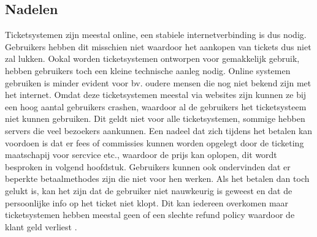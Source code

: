 \subsection{Nadelen}
Ticketsystemen zijn meestal online, een stabiele internetverbinding is dus nodig. Gebruikers hebben dit misschien niet waardoor het aankopen van tickets dus niet zal lukken. 
Ookal worden ticketsystemen ontworpen voor gemakkelijk gebruik, hebben gebruikers toch een kleine technische aanleg nodig. Online systemen gebruiken is minder evident voor bv. oudere mensen die nog niet bekend zijn met het internet.
Omdat deze ticketsystemen meestal via websites zijn kunnen ze bij een hoog aantal gebruikers crashen, waardoor al de gebruikers het ticketsysteem niet kunnen gebruiken. Dit geldt niet voor alle ticketsystemen, sommige hebben servers die veel bezoekers aankunnen.
Een nadeel dat zich tijdens het betalen kan voordoen is dat er fees of commissies kunnen worden opgelegt door de ticketing maatschapij voor sercvice etc., waardoor de prijs kan oplopen, dit wordt besproken in volgend hoofdstuk.
Gebruikers kunnen ook ondervinden dat er beperkte betaalmethodes zijn die niet voor hen werken. Als het betalen dan toch gelukt is, kan het zijn dat de gebruiker niet nauwkeurig is geweest en dat de persoonlijke info op het ticket niet klopt.
Dit kan iedereen overkomen maar ticketsystemen hebben meestal geen of een slechte refund policy waardoor de klant geld verliest \cite{concert-tickets-online2021}. 

